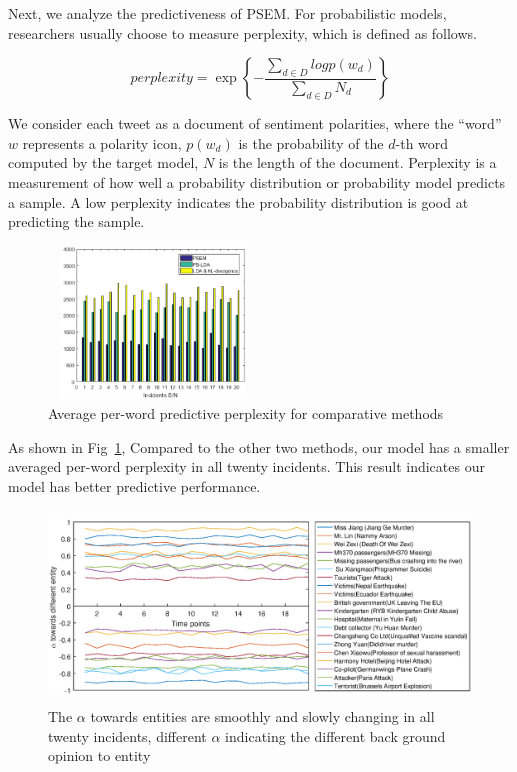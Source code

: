 \documentclass[runningheads]{llncs}
\begin{document}
Next, we analyze the predictiveness of PSEM. For probabilistic models, researchers usually choose to measure perplexity, which is defined as follows. 

\begin{equation}
    perplexity= \exp\left\{-\frac{\sum_{d \in D}logp(w_d)}{\sum_{d \in D}N_d} \right\}
\end{equation}

We consider each tweet as a document of sentiment polarities, where the ``word'' $w$ represents a polarity icon, $p(w_d)$ is the probability of the $d$-th word computed by the target model, $N$ is the length of the document. 
Perplexity is a measurement of how well a probability distribution or probability model predicts a sample. A low perplexity indicates the probability distribution is good at predicting the sample. 

\begin{figure}
    \centering
    \includegraphics[width=0.5\textwidth,height=1.6in]{perplexity2.eps}
    \setlength{\abovecaptionskip}{-0.1cm}
    \caption{Average per-word predictive perplexity for comparative methods}\label{fig:perplexity}
\end{figure}



As shown in Fig~\ref{fig:perplexity},  Compared to the other two methods, our model has a smaller averaged per-word perplexity in all twenty incidents. This result indicates our model has better predictive performance.

\begin{figure}
    \centering
    \includegraphics[width=1.0\textwidth,height=2.0in]{newalpha3.eps}
    \setlength{\abovecaptionskip}{-0.1cm}
    \caption{The $\alpha$ towards entities are smoothly and slowly changing in all twenty incidents, diﬀerent $\alpha$ indicating the diﬀerent back ground opinion to entity}\label{fig:alpha}
\end{figure}
\end{document}
